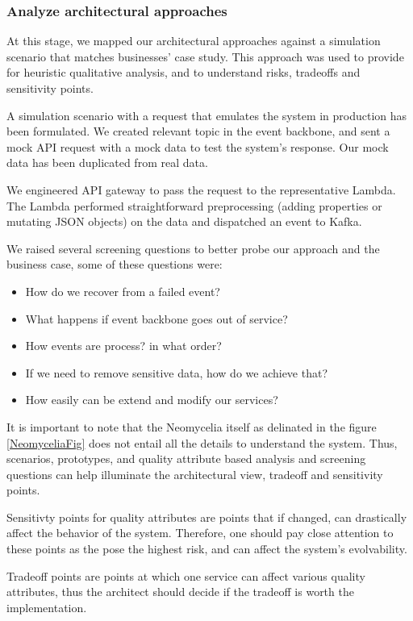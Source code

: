 \documentclass[conference]{IEEEtran}
\begin{document}
\subsubsection{Analyze architectural approaches}

At this stage, we mapped our architectural approaches against a simulation scenario that matches businesses' case study. This approach was used to provide for heuristic qualitative analysis, and to understand risks, tradeoffs and sensitivity points.

A simulation scenario with a request that emulates the system in production has been formulated. We created relevant topic in the event backbone, and sent a mock API request with a mock data to test the system's response. Our mock data has been duplicated from real data.

We engineered API gateway to pass the request to the representative Lambda. The Lambda performed straightforward preprocessing (adding properties or mutating JSON objects) on the data and dispatched an event to Kafka.

We raised several screening questions to better probe our approach and the business case, some of these questions were: 

\begin{itemize}
    \item How do we recover from a failed event? 
    \item What happens if event backbone goes out of service?
    \item How events are process? in what order? 
    \item If we need to remove sensitive data, how do we achieve that?
    \item How easily can be extend and modify our services?
\end{itemize}

It is important to note that the Neomycelia itself as delinated in the figure \ref{NeomyceliaFig} does not entail all the details to understand the system. Thus, scenarios, prototypes, and quality attribute based analysis and screening questions can help illuminate the architectural view, tradeoff and sensitivity points. \cite{KazmanATAM}

Sensitivty points for quality attributes are points that if changed, can drastically affect the behavior of the system. Therefore, one should pay close attention to these points as the pose the highest risk, and can affect the system's evolvability.

Tradeoff points are points at which one service can affect various quality attributes, thus the architect should decide if the tradeoff is worth the implementation.
\end{document}

